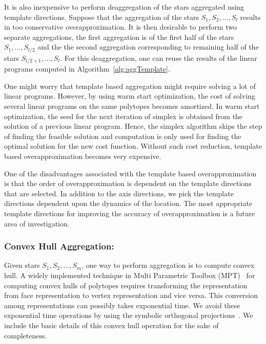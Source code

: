 It is also inexpensive to perform deaggregation of the stars aggregated using template directions. 
%
Suppose that the aggregation of the stars $S_1, S_2, \ldots, S_l$ results in too conservative overapproximation. 
%
It is then desirable to perform two separate aggregations, the first aggregation is of the first half of the stars $S_1, \ldots, S_{l/2}$ and the the second aggregation corresponding to remaining half of the stars $S_{l/2+1}, \ldots, S_{l}$. 
%
For this deaggregation, one can reuse the results of the linear programs computed in Algorithm~\ref{alg:aggTemplate}.

One might worry that template based aggregation might require solving a lot of linear programs. 
%
However, by using warm start optimization, the cost of solving several linear programs on the same polytopes becomes amortized. 
%
In warm start optimization, the seed for the next iteration of simplex is obtained from the solution of a previous linear program.
%
Hence, the simplex algorithm skips the step of finding the feasible solution and computation is only used for finding the optimal solution for the new cost function.
%
Without such cost reduction, template based overapproximation becomes very expensive. 
%

One of the disadvantages associated with the template based overapproximation is that the order of overapproximation is dependent on the template directions that are selected. 
%
In addition to the axis directions, we pick the template directions dependent upon the dynamics of the location. 
%
The most appropriate template directions for improving the accuracy of overapproximation is a future area of investigation.

\subsubsection{Convex Hull Aggregation:}
\label{sec:convexhullAgg}
Given stars $S_1, S_2, \ldots, S_m$, one way to perform aggregation is to compute convex hull. 
%
A widely implemented technique in Multi Parametric Toolbox (MPT)~\cite{kvasnica2004multi} for computing convex hulls of polytopes requires transforming the representation from face representation to vertex representation and vice versa. 
%
This conversion among representations can possibly takes exponential time. 
%
We avoid these exponential time operations by using the symbolic orthogonal projections~\cite{hagemann2014reachability}. 
%
We include the basic details of this convex hull operation for the sake of completeness.

